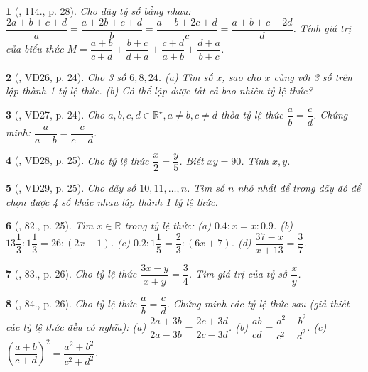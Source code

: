 \documentclass{article}
\newtheorem{baitoan}{}
\begin{document}
\begin{baitoan}[\cite{Tuyen_Toan_7}, 114., p. 28]
	Cho dãy tỷ số bằng nhau: $\dfrac{2a + b + c + d}{a} = \dfrac{a + 2b + c + d}{b} = \dfrac{a + b + 2c + d}{c} = \dfrac{a + b + c + 2d}{d}$. Tính giá trị của biểu thức $M = \dfrac{a + b}{c + d} + \dfrac{b + c}{d + a} + \dfrac{c + d}{a + b} + \dfrac{d + a}{b + c}$.
\end{baitoan}

\begin{baitoan}[\cite{Binh_Toan_7_tap_1}, VD26, p. 24]
	Cho 3 số $6,8,24$. (a) Tìm số $x$, sao cho $x$ cùng với 3 số trên lập thành 1 tỷ lệ thức. (b) Có thể lập được tất cả bao nhiêu tỷ lệ thức?
\end{baitoan}

\begin{baitoan}[\cite{Binh_Toan_7_tap_1}, VD27, p. 24]
	Cho $a,b,c,d\in\mathbb{R}^\star,a\ne b,c\ne d$ thỏa tỷ lệ thức $\dfrac{a}{b} = \dfrac{c}{d}$. Chứng minh: $\dfrac{a}{a - b} = \dfrac{c}{c - d}$.
\end{baitoan}

\begin{baitoan}[\cite{Binh_Toan_7_tap_1}, VD28, p. 25]
	Cho tỷ lệ thức $\dfrac{x}{2} = \dfrac{y}{5}$. Biết $xy = 90$. Tính $x,y$.
\end{baitoan}

\begin{baitoan}[\cite{Binh_Toan_7_tap_1}, VD29, p. 25]
	Cho dãy số $10,11,\ldots,n$. Tìm số $n$ nhỏ nhất để trong dãy đó để chọn được 4 số khác nhau lập thành 1 tỷ lệ thức.
\end{baitoan}

\begin{baitoan}[\cite{Binh_Toan_7_tap_1}, 82., p. 25]
	Tìm $x\in\mathbb{R}$ trong tỷ lệ thức: (a) $0.4:x = x:0.9$. (b) $13\dfrac{1}{3}:1\dfrac{1}{3} = 26:(2x - 1)$. (c) $0.2:1\dfrac{1}{5} = \dfrac{2}{3}:(6x + 7)$. (d) $\dfrac{37 - x}{x + 13} = \dfrac{3}{7}$.	
\end{baitoan}

\begin{baitoan}[\cite{Binh_Toan_7_tap_1}, 83., p. 26]
	Cho tỷ lệ thức $\dfrac{3x - y}{x + y} = \dfrac{3}{4}$. Tìm giá trị của tỷ số $\dfrac{x}{y}$.
\end{baitoan}

\begin{baitoan}[\cite{Binh_Toan_7_tap_1}, 84., p. 26]
	Cho tỷ lệ thức $\dfrac{a}{b} = \dfrac{c}{d}$. Chứng minh các tỷ lệ thức sau (giả thiết các tỷ lệ thức đều có nghĩa): (a) $\dfrac{2a + 3b}{2a - 3b} = \dfrac{2c + 3d}{2c - 3d}$. (b) $\dfrac{ab}{cd} = \dfrac{a^2 - b^2}{c^2 - d^2}$. (c) $\left(\dfrac{a + b}{c + d}\right)^2 = \dfrac{a^2 + b^2}{c^2 + d^2}$.	
\end{baitoan}
\end{document}

